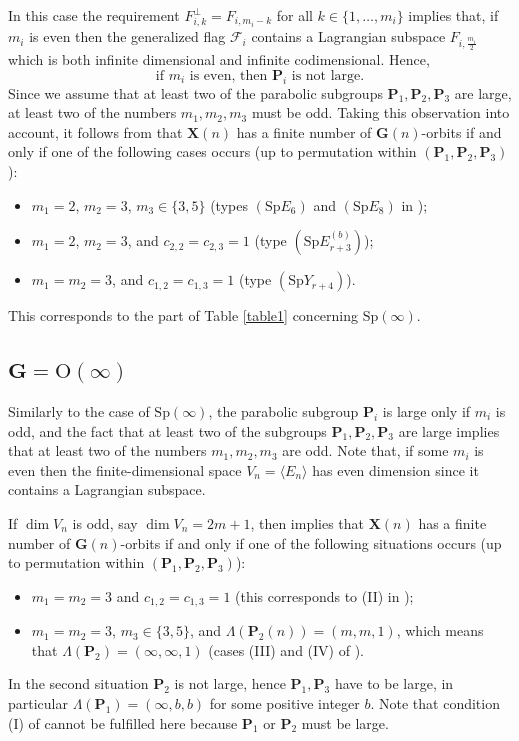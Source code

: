 \documentclass[12pt]{amsart}
\newcommand{\Sp}{\mathrm{Sp}}
\renewcommand{\O}{\mathrm{O}}
\newcommand{\G}{\mathbf{G}}
\renewcommand{\P}{\mathbf{P}}
\newcommand{\X}{\mathbf{X}}
\newcommand{\Ff}{\mathcal{F}}
\renewcommand{\span}[1]{\langle #1\rangle}
\numberwithin{equation}{section}
\theoremstyle{definition}
\begin{document}
\begin{appendix}
In this case the requirement $F_{i,k}^\perp=F_{i,m_i-k}$ for all $k\in\{1,\ldots,m_i\}$ implies that, if $m_i$ is even then the generalized flag $\Ff_i$ contains a Lagrangian subspace $F_{i,\frac{m_i}{2}}$ which is both infinite dimensional and infinite codimensional. Hence,
\begin{equation}
\mbox{if $m_i$ is even, then $\P_i$ is not large.}
\end{equation}
Since we assume that at least two of the parabolic subgroups $\P_1,\P_2,\P_3$ are large, at least two of the numbers $m_1,m_2,m_3$ must be odd. Taking this observation into account, it follows from \cite[Theorem 1.2]{MWZ2} that $\X(n)$ has a finite number of $\G(n)$-orbits if and only if one of the following cases occurs (up to permutation within $(\P_1,\P_2,\P_3)$):
\begin{itemize}
\item $m_1=2$, $m_2=3$, $m_3\in\{3,5\}$ (types $(\mathrm{Sp}E_6)$ and $(\mathrm{Sp}E_8)$ in \cite[Theorem 1.2]{MWZ2});
\item $m_1=2$, $m_2=3$, and $c_{2,2}=c_{2,3}=1$ (type $(\mathrm{Sp}E_{r+3}^{(b)})$);
\item $m_1=m_2=3$, and $c_{1,2}=c_{1,3}=1$ (type $(\mathrm{Sp}Y_{r+4})$).
\end{itemize}
This corresponds to the part of Table \ref{table1} concerning $\Sp(\infty)$.


\subsection{$\G=\O(\infty)$} Similarly to the case of $\Sp(\infty)$, the parabolic subgroup $\P_i$ is large only if $m_i$ is odd, and
the fact that at least two of the subgroups $\P_1,\P_2,\P_3$ are large implies that at least two of the numbers $m_1,m_2,m_3$ are odd.
Note that, if some $m_i$ is even then the finite-dimensional space $V_n=\span{E_n}$ has even dimension since it contains a Lagrangian subspace. 

If $\dim V_n$ is odd, say $\dim V_n=2m+1$, then \cite[Theorem 1.6]{Matsuki1} implies that $\X(n)$ has a finite number of $\G(n)$-orbits if and only if one of the following situations occurs (up to permutation within $(\P_1,\P_2,\P_3)$): 
\begin{itemize}
\item $m_1=m_2=3$ and $c_{1,2}=c_{1,3}=1$ (this corresponds to (II) in \cite[Theorem 1.6]{Matsuki1});
\item $m_1=m_2=3$, $m_3\in\{3,5\}$, and $\Lambda(\P_2(n))=(m,m,1)$, which means that $\Lambda(\P_2)=(\infty,\infty,1)$  (cases (III) and (IV) of \cite[Theorem 1.6]{Matsuki1}).
\end{itemize}
In the second situation $\P_2$ is not large, hence $\P_1,\P_3$ have to be large, in particular  $\Lambda(\P_1)=(\infty,b,b)$ for some positive integer $b$. Note that condition (I) of \cite[Theorem 1.6]{Matsuki1} cannot be fulfilled here because $\P_1$ or $\P_2$ must be large.


\end{appendix}
\end{document}
